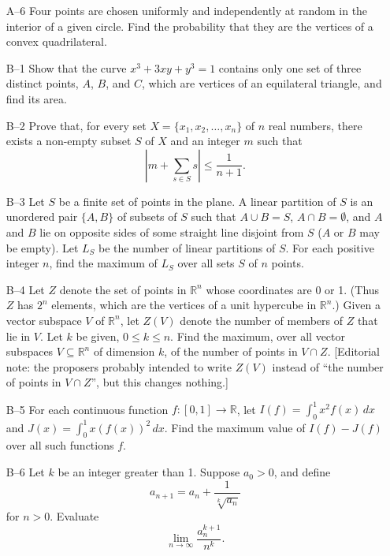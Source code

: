 \documentclass[amssymb,twocolumn,pra,10pt,aps]{revtex4-1}
\begin{document}
\begin{itemize}
\item[A--6]
Four points are chosen uniformly and independently at random in the interior
of a given circle. Find the probability that they are the vertices
of a convex quadrilateral.

\item[B--1]
Show that the curve $x^3 + 3xy + y^3 = 1$ contains only one set of three
distinct points, $A$, $B$, and $C$, which are vertices of an equilateral
triangle, and find its area.

\item[B--2]
Prove that, for every set $X = \{x_1, x_2, \dots, x_n\}$ of $n$
real numbers, there exists a non-empty subset $S$ of $X$ and an integer $m$
such that
\[
\left| m + \sum_{s \in S} s \right| \leq \frac{1}{n+1}.
\]

\item[B--3]
Let $S$ be a finite set of points in the plane. A linear partition of $S$
is an unordered pair $\{A,B\}$ of subsets of $S$ such that $A \cup B = S$,
$A \cap B = \emptyset$, and $A$ and $B$ lie on opposite sides of some
straight line disjoint from $S$ ($A$ or $B$ may be empty). Let $L_S$ be the
number of linear partitions of $S$. For each positive integer $n$, find the
maximum of $L_S$ over all sets $S$ of $n$ points.

\item[B--4]
Let $Z$ denote the set of points in $\mathbb{R}^n$ whose coordinates are 0
or 1. (Thus $Z$ has $2^n$ elements, which are the vertices of a unit
hypercube in $\mathbb{R}^n$.) Given a vector subspace $V$
of $\mathbb{R}^n$, let $Z(V)$
denote the number of members of $Z$ that lie in $V$. Let $k$ be given,
$0 \leq k \leq n$. Find the maximum, over all vector subspaces $V
\subseteq \mathbb{R}^n$ of dimension $k$, of the number of points in
$V \cap Z$. [Editorial note: the proposers probably intended to write
$Z(V)$ instead of
``the number of points in $V \cap Z$'', but this changes nothing.]

\item[B--5]
For each continuous function $f: [0,1] \to \mathbb{R}$, let $I(f) =
\int_0^1 x^2 f(x)\,dx$ and $J(x) = \int_0^1 x \left(f(x)\right)^2\,dx$.
Find the maximum value of $I(f) - J(f)$ over all such functions $f$.

\item[B--6]
Let $k$ be an integer greater than 1. Suppose $a_0 > 0$, and define
\[
a_{n+1} = a_n + \frac{1}{\sqrt[k]{a_n}}
\]
for $n > 0$. Evaluate
\[
\lim_{n \to \infty} \frac{a_n^{k+1}}{n^k}.
\]
\end{itemize}
\end{document}
